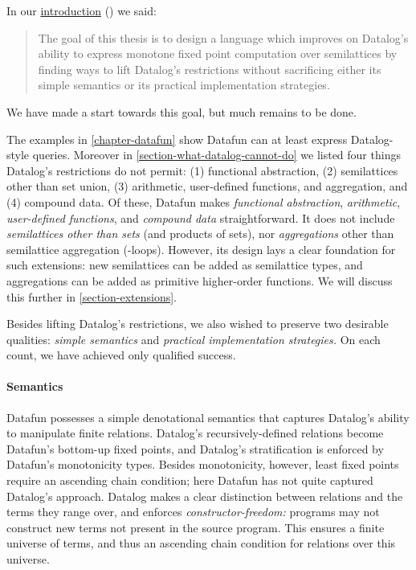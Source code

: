 
\noindent
In our \hyperref[goal-of-thesis]{introduction}
() we said:

\begin{quote}
  The goal of this thesis is to design a language which improves on Datalog's
  ability to express monotone fixed point computation over semilattices by
  finding ways to lift Datalog's restrictions without sacrificing either its
  simple semantics or its practical implementation strategies.
\end{quote}

\noindent
We have made a start towards this goal, but much remains to be done.

The examples in \cref{chapter-datafun} show Datafun can at least express
Datalog-style queries. Moreover in \cref{section-what-datalog-cannot-do} we
listed four things Datalog's restrictions do not permit: (1) functional
abstraction, (2) semilattices other than set union, (3) arithmetic, user-defined
functions, and aggregation, and (4) compound data.
%
Of these, Datafun makes \emph{functional abstraction}, \emph{arithmetic}, \emph{user-defined functions}, and \emph{compound data} straightforward.
%
It does not include \emph{semilattices other than sets} (and products of sets),
nor \emph{aggregations} other than semilattice aggregation (-loops).
%
However, its design lays a clear foundation for such extensions: new semilattices can be added as semilattice types, and aggregations can be added as primitive higher-order functions. We will discuss this further in \cref{section-extensions}.

Besides lifting Datalog's restrictions, we also wished to preserve two desirable
qualities: \emph{simple semantics} and \emph{practical implementation
strategies.} On each count, we have achieved only qualified success.

\paragraph{Semantics}

Datafun possesses a simple denotational semantics that captures Datalog's
ability to manipulate finite relations. Datalog's recursively-defined relations
become Datafun's bottom-up fixed points, and Datalog's stratification is
enforced by Datafun's monotonicity types.
%
Besides monotonicity, however, least fixed points require an ascending chain condition; here Datafun has not quite captured Datalog's approach.
%
Datalog makes a clear distinction between relations and the terms they range over, and enforces \emph{constructor-freedom:} programs may not construct new terms not present in the source program. This ensures a finite universe of terms, and thus an ascending chain condition for relations over this universe.

